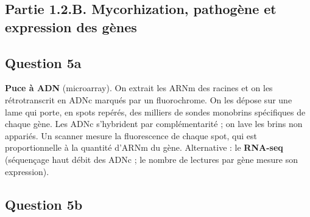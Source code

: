 \documentclass[11pt,a4paper]{article}
\begin{document}
\hypertarget{partie-1.2.b.-mycorhization-pathoguxe8ne-et-expression-des-guxe8nes}{%
\subsection{Partie 1.2.B. Mycorhization, pathogène et expression des gènes}\label{partie-1.2.b.-mycorhization-pathoguxe8ne-et-expression-des-guxe8nes}}

\hypertarget{question-5a}{%
\subsection{Question 5a}\label{question-5a}}

\textbf{Puce à ADN} (microarray). On extrait les ARNm des racines et on les rétrotranscrit en ADNc marqués par un fluorochrome. On les dépose sur une lame qui porte, en spots repérés, des milliers de sondes monobrins spécifiques de chaque gène. Les ADNc s'hybrident par complémentarité ; on lave les brins non appariés. Un scanner mesure la fluorescence de chaque spot, qui est proportionnelle à la quantité d'ARNm du gène. Alternative : le \textbf{RNA-seq} (séquençage haut débit des ADNc ; le nombre de lectures par gène mesure son expression).

\hypertarget{question-5b}{%
\subsection{Question 5b}\label{question-5b}}
\end{document}
